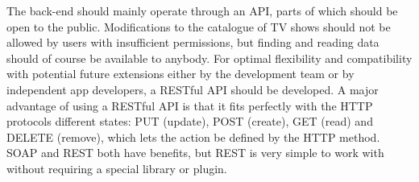 The back-end should mainly operate through an API, parts of which should be open to the public. Modifications to the catalogue of TV shows should not be allowed by users with insufficient permissions, but finding and reading data should of course be available to anybody. For optimal flexibility and compatibility with potential future extensions either by the development team or by independent app developers, a RESTful API should be developed.
A major advantage of using a RESTful API is that it fits perfectly with the HTTP protocols different states: PUT (update), POST (create), GET (read) and DELETE (remove), which lets the action be defined by the HTTP method. 
SOAP and REST both have benefits, but REST is very simple to work with without requiring a special library or plugin.  
